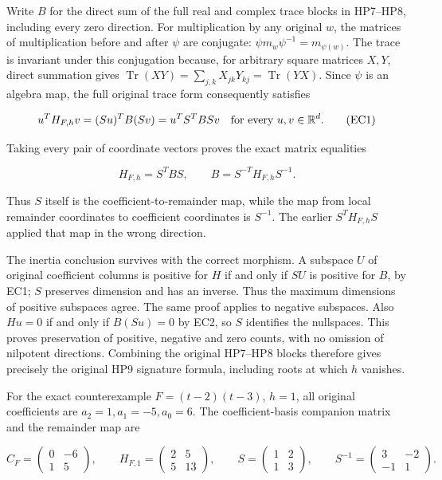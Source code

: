\documentclass[
  11pt,
]{article}
\begin{document}
Write \(B\) for the direct sum of the full real and complex trace blocks
in HP7--HP8, including every zero direction. For multiplication by any
original \(w\), the matrices of multiplication before and after \(\psi\)
are conjugate: \(\psi m_w\psi^{-1}=m_{\psi(w)}\). The trace is invariant
under this conjugation because, for arbitrary square matrices \(X,Y\),
direct summation gives
\(\operatorname{Tr}(XY)=\sum_{j,k}X_{jk}Y_{kj}=\operatorname{Tr}(YX)\).
Since \(\psi\) is an algebra map, the full original trace form
consequently satisfies

\[
 u^T H_{F,h}v=(Su)^T B(Sv)=u^T S^TBSv
 \quad\hbox{for every }u,v\in\mathbb R^d.
 \tag{EC1}
\]

Taking every pair of coordinate vectors proves the exact matrix
equalities

\[
 H_{F,h}=S^TBS,\qquad
 B=S^{-T}H_{F,h}S^{-1}.
 \tag{EC2}
\]

Thus \(S\) itself is the coefficient-to-remainder map, while the map
from local remainder coordinates to coefficient coordinates is
\(S^{-1}\). The earlier \(S^TH_{F,h}S\) applied that map in the wrong
direction.

The inertia conclusion survives with the correct morphism. A subspace
\(U\) of original coefficient columns is positive for \(H\) if and only
if \(SU\) is positive for \(B\), by EC1; \(S\) preserves dimension and
has an inverse. Thus the maximum dimensions of positive subspaces agree.
The same proof applies to negative subspaces. Also \(Hu=0\) if and only
if \(B(Su)=0\) by EC2, so \(S\) identifies the nullspaces. This proves
preservation of positive, negative and zero counts, with no omission of
nilpotent directions. Combining the original HP7--HP8 blocks therefore
gives precisely the original HP9 signature formula, including roots at
which \(h\) vanishes.

For the exact counterexample \(F=(t-2)(t-3)\), \(h=1\), all original
coefficients are \(a_2=1,a_1=-5,a_0=6\). The coefficient-basis companion
matrix and the remainder map are

\[
 C_F=\begin{pmatrix}0&-6\\1&5\end{pmatrix},\qquad
 H_{F,1}=\begin{pmatrix}2&5\\5&13\end{pmatrix},\qquad
 S=\begin{pmatrix}1&2\\1&3\end{pmatrix},\qquad
 S^{-1}=\begin{pmatrix}3&-2\\-1&1\end{pmatrix}.
 \tag{EC3}
\]
\end{document}
